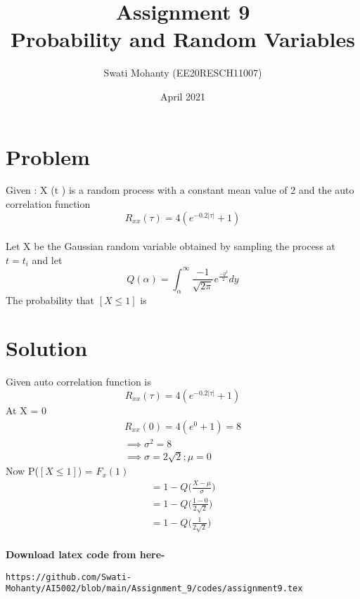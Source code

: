 \documentclass[journal,12pt,twocolumn]{IEEEtran}
\title{Assignment 9
\\Probability and Random Variables }
\author{Swati Mohanty (EE20RESCH11007) }
\date{April 2021}
\begin{document}
\maketitle


\section{Problem}
Given : X (t ) is a random process with a constant mean value of 2 and the auto
correlation function 
\begin{equation*}
   R_{xx}(\tau) = 4(e^{-0.2|\tau|}+1) 
\end{equation*}
\\Let X be the Gaussian random variable obtained by sampling the process at $t=t_i$ and let 
\begin{equation*}
Q(\alpha)={\int_{\alpha}^{\infty}}\dfrac{-1}{\sqrt{2\pi}}e^{\frac{-y^2}{2}}dy
\end{equation*}
%
The probability that $[\textit{X}\leqslant1]$ is

\section{Solution}
Given auto correlation function is
\begin{equation*}
   R_{xx}(\tau) = 4(e^{-0.2|\tau|}+1) 
\end{equation*}
At X = 0
\begin{align}
     R_{xx}(0) = 4(e^{0}+1) = 8
     \\\implies \sigma^2 = 8
    \\ \implies \sigma = 2\sqrt{2} ; \mu = 0{}{}
\end{align}
Now P($[\textit{X}\leqslant1]$) = $F_x(1)$
\begin{align}
    =1 - Q\bigg(\frac{X-\mu}{\sigma}\bigg)
    \\=1 - Q\bigg(\frac{1-0}{2\sqrt{2}}\bigg)
    \\=1 - Q\bigg(\frac{1}{2\sqrt{2}}\bigg)
\end{align}
\\\textbf{Download latex code from here-}\\
\begin{lstlisting}
https://github.com/Swati-Mohanty/AI5002/blob/main/Assignment_9/codes/assignment9.tex
\end{lstlisting}
\end{document}
